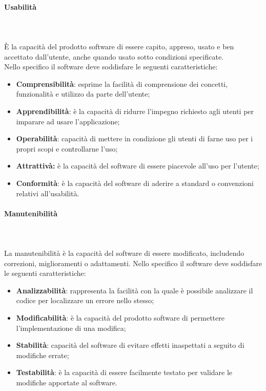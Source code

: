 \paragraph{Usabilità}\mbox{} \\ \mbox{} \\
È la capacità del prodotto software di essere capito, appreso, usato e ben accettato dall'utente, anche quando usato sotto condizioni specificate. \\
Nello specifico il software deve soddisfare le seguenti caratteristiche:
\begin{itemize}
	\item \textbf{Comprensibilità}: esprime la facilità di comprensione dei concetti, funzionalità e utilizzo da parte dell'utente;
	\item \textbf{Apprendibilità}: è la capacità di ridurre l'impegno richiesto agli utenti per imparare ad usare l'applicazione;
	\item \textbf{Operabilità}: capacità di mettere in condizione gli utenti di farne uso per i propri scopi e controllarne l'uso;
	\item \textbf{Attrattivà:} è la capacità del software di essere piacevole all'uso per l'utente;
	\item \textbf{Conformità}: è la capacità del software di aderire a standard o convenzioni relativi all'usabilità.

\end{itemize}
\paragraph{Manutenibilità}\mbox{} \\ \mbox{} \\
La manutenibilità è la capacità del software di essere modificato, includendo correzioni, miglioramenti o adattamenti.
Nello specifico il software deve soddisfare le seguenti caratteristiche:
\begin{itemize}
	\item \textbf{Analizzabilità}: rappresenta la facilità con la quale è possibile analizzare il codice per localizzare un errore nello stesso;
	\item \textbf{Modificabilità}: è la capacità del prodotto software di permettere l'implementazione di una modifica;
	\item \textbf{Stabilità}: capacità del software di evitare effetti inaspettati a seguito di modifiche errate;
	\item \textbf{Testabilità}: è la capacità di essere facilmente testato per validare le modifiche apportate al software.
\end{itemize}
